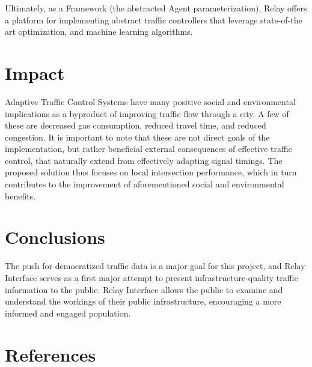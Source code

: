 \documentclass[a4paper,10pt]{article}
\begin{document}
\begin{multicols}{2}
Ultimately, as a Framework (the abstracted Agent parameterization), Relay offers a platform for implementing abstract traffic controllers that leverage state-of-the art optimization, and machine learning algorithms.


\section{Impact}
Adaptive Traffic Control Systems have many positive social and environmental implications as a byproduct of improving traffic flow through a city.
A few of these are decreased gas consumption, reduced travel time, and reduced congestion.
It is important to note that these are not direct goals of the implementation, but rather beneficial external consequences of effective traffic control, that naturally extend from effectively adapting signal timings.
The proposed solution thus focuses on local intersection performance, which in turn contributes to the improvement of aforementioned social and environmental benefits.

\section{Conclusions}

The push for democratized traffic data is a major goal for this project, and Relay Interface serves as a first major attempt to present infrastructure-quality traffic information to the public. Relay Interface allows the public to examine and understand the workings of their public infrastructure, encouraging a more informed and engaged population.

\section{References}




\end{multicols}
\end{document}
